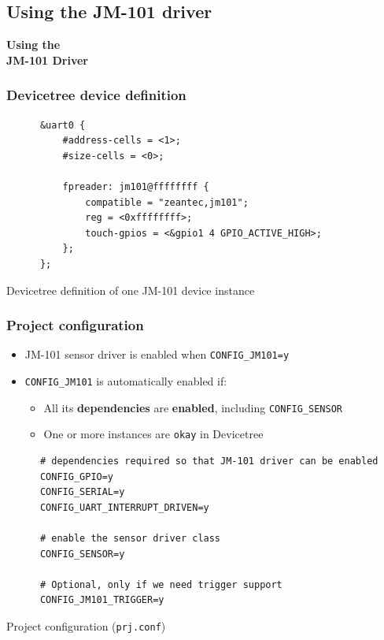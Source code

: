 \documentclass[handout]{beamer}
\begin{document}
\subsection{Using the JM-101 driver}

\begin{frame}
  \begin{center}
    \Large \textbf{Using the\\JM-101 Driver}
  \end{center}
\end{frame}

\begin{frame}[fragile]
  \frametitle{Devicetree device definition}

  \begin{listing}[H]
    \begin{verbatim}
      &uart0 {
          #address-cells = <1>;
          #size-cells = <0>;

          fpreader: jm101@ffffffff {
              compatible = "zeantec,jm101";
              reg = <0xffffffff>;
              touch-gpios = <&gpio1 4 GPIO_ACTIVE_HIGH>;
          };
      };
    \end{verbatim}
    \caption{Devicetree definition of one JM-101 device instance}
  \end{listing}
\end{frame}

\begin{frame}[fragile]
  \frametitle{Project configuration}

  \begin{itemize}
    \item JM-101 sensor driver is enabled when \texttt{CONFIG\_JM101=y}
    \item \texttt{CONFIG\_JM101} is automatically enabled if:
          \begin{itemize}
            \item All its \textbf{dependencies} are \textbf{enabled}, including
                  \texttt{CONFIG\_SENSOR}
            \item One or more instances are \texttt{okay} in Devicetree
          \end{itemize}
  \end{itemize}
  \begin{listing}[H]
    \begin{verbatim}
      # dependencies required so that JM-101 driver can be enabled
      CONFIG_GPIO=y
      CONFIG_SERIAL=y
      CONFIG_UART_INTERRUPT_DRIVEN=y

      # enable the sensor driver class
      CONFIG_SENSOR=y

      # Optional, only if we need trigger support
      CONFIG_JM101_TRIGGER=y
    \end{verbatim}
    \caption{Project configuration (\texttt{prj.conf})}
  \end{listing}
\end{frame}
\end{document}
